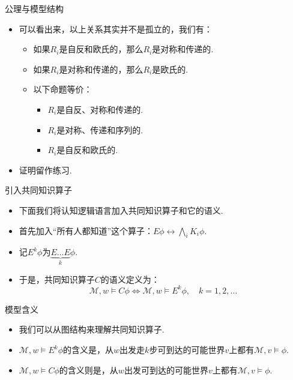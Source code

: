 {公理与模型结构}
\begin{itemize}
    \item 可以看出来，以上关系其实并不是孤立的，我们有：
\begin{lemma} %
\begin{itemize}
    \item 如果$R_i$是自反和欧氏的，那么$R_i$是对称和传递的.
    \item 如果$R_i$是对称和传递的，那么$R_i$是欧氏的.
    \item 以下命题等价：
    \begin{itemize}
        \item $R_i$是自反、对称和传递的.
\item  $R_i$是对称、传递和序列的.
\item $R_i$是自反和欧氏的.
    \end{itemize}
\end{itemize}
\end{lemma}
\item 证明留作练习.
\end{itemize}


{引入共同知识算子}
\begin{itemize}
    \item 下面我们将认知逻辑语言加入共同知识算子和它的语义.
    \item 首先加入“所有人都知道”这个算子：$E\phi\leftrightarrow\bigwedge_i K_i\phi$.
    \item 记$E^k\phi$为$\underbrace{E\dots E}_k\phi$.
    \item 于是，共同知识算子$C$的语义定义为：
    \[\mathcal M,w\vDash C\phi\iff\mathcal M,w\vDash E^k\phi,\quad k=1,2,\dots\]
\end{itemize}


{模型含义}
\begin{itemize}
    \item 我们可以从图结构来理解共同知识算子.
    \item $\mathcal M,w\vDash E^k\phi$的含义是，从$w$出发走$k$步可到达的可能世界$v$上都有$\mathcal M,v\vDash \phi$.
    \item $\mathcal M,w\vDash C\phi$的含义则是，从$w$出发可到达的可能世界$v$上都有$\mathcal M,v\vDash \phi$.
\end{itemize}


